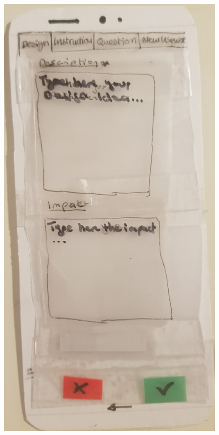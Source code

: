 \begin{figure}[H]
	\label{tab:example}
	\centering
	\begin{minipage}{.5\textwidth}
		\centering
		\includegraphics[width=.8\linewidth]{resources/conception/lowfi_form.jpg}
		\label{fig:test1}
	\end{minipage}%
	\begin{minipage}{.5\textwidth}
		\centering

\end{minipage}
\end{figure}
